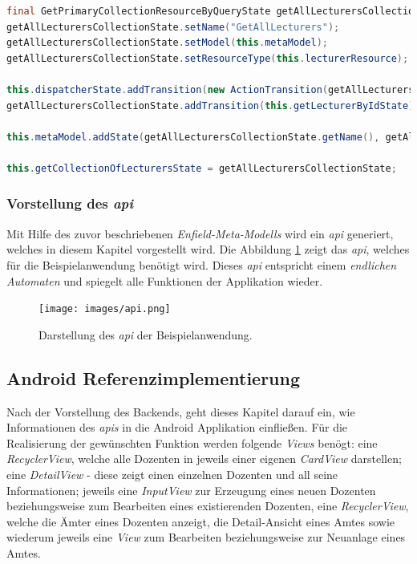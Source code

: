 \begin{lstlisting}[label=lst:getState_impl,
language=java,
firstnumber=1,
caption=Erzeugung des \textit{GetAllLecturers States}. ]
final GetPrimaryCollectionResourceByQueryState getAllLecturersCollectionState = new GetPrimaryCollectionResourceByQueryState();
getAllLecturersCollectionState.setName("GetAllLecturers");
getAllLecturersCollectionState.setModel(this.metaModel);
getAllLecturersCollectionState.setResourceType(this.lecturerResource);

this.dispatcherState.addTransition(new ActionTransition(getAllLecturersCollectionState, "getAllLecturers"));
getAllLecturersCollectionState.addTransition(this.getLecturerByIdState);

this.metaModel.addState(getAllLecturersCollectionState.getName(), getAllLecturersCollectionState);

this.getCollectionOfLecturersState = getAllLecturersCollectionState;
\end{lstlisting}
 
 \newpage
 
\subsubsection{Vorstellung des \textit{\acf{api}}}
Mit Hilfe des zuvor beschriebenen \textit{Enfield-Meta-Modells} wird ein \textit{\acl{api}} generiert, welches in diesem Kapitel vorgestellt wird.
Die Abbildung \ref{fig:api} zeigt das \textit{\acl{api}}, welches für die Beispielanwendung benötigt wird. Dieses\textit{ \ac{api}} entspricht einem \textit{endlichen Automaten} und spiegelt alle Funktionen der Applikation wieder.  

\begin{figure}[H]
	\begin{center}
		\texttt{[image: images/api.png]}
		\caption{Darstellung des \textit{\ac{api}} der Beispielanwendung.}
		\label{fig:api}
	\end{center}
\end{figure}

\subsection{Android Referenzimplementierung}\label{sec:ref_impl}
Nach der Vorstellung des Backends, geht dieses Kapitel darauf ein, wie Informationen des \textit{\acl{api}s} in die Android Applikation einfließen.
Für die Realisierung der gewünschten Funktion werden folgende \textit{Views} benögt: eine \textit{RecyclerView}, welche alle Dozenten in jeweils einer eigenen \textit{CardView} darstellen; eine \textit{DetailView} - diese zeigt einen einzelnen Dozenten und all seine Informationen; jeweils eine \textit{InputView} zur Erzeugung eines neuen Dozenten beziehungsweise zum Bearbeiten eines existierenden Dozenten, eine \textit{RecyclerView}, welche die Ämter eines Dozenten anzeigt, die Detail-Ansicht eines Amtes sowie wiederum jeweils eine \textit{View} zum Bearbeiten beziehungsweise zur Neuanlage eines Amtes.

